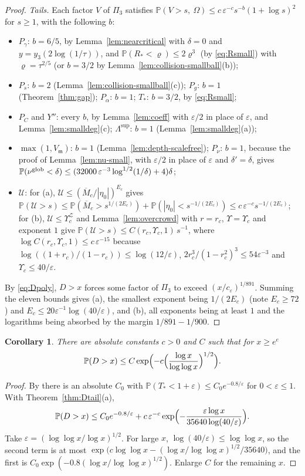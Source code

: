 \documentclass[11pt]{amsart}
\newtheorem{corollary}[theorem]{Corollary}
\theoremstyle{definition}
\theoremstyle{remark}
\numberwithin{equation}{section}
\newcommand{\PP}{\mathbb{P}}
\newcommand{\eps}{\varepsilon}
\begin{document}
\begin{proof}
\emph{Tails.} Each factor $V$ of $\Pi_3$ satisfies $\PP(V>s,\ \Omega)\le c\,\eps^{-c}s^{-b}(1+\log s)^2$ for $s\ge1$, with the following $b$:
\begin{itemize}
\item $P_\gamma$: $b=6/5$, by Lemma~\ref{lem:nearcritical} with $\delta=0$ and $y=y_3(2\log(1/\tau))$, and $\PP(R_*<\varrho)\le2\varrho^3$ (by \eqref{eq:Rsmall}) with $\varrho=\tau^{2/5}$ (or $b=3/2$ by Lemma~\ref{lem:collision-smallball}(b));
\item $P_s$: $b=2$ (Lemma~\ref{lem:collision-smallball}(c)); $P_g$: $b=1$ (Theorem~\ref{thm:gap}); $P_\alpha$: $b=1$; $T_*$: $b=3/2$, by \eqref{eq:Rsmall};
\item $P_C$ and $Y''$: every $b$, by Lemma~\ref{lem:coeff} with $\eps/2$ in place of $\eps$, and Lemma~\ref{lem:smalldeg}(c); $\Lambda^{\sup}$: $b=1$ (Lemma~\ref{lem:smalldeg}(a));
\item $\max(1,V_{\mathfrak m})$: $b=1$ (Lemma~\ref{lem:depth-scalefree}); $P_\nu$: $b=1$, because the proof of Lemma~\ref{lem:nu-small}, with $\eps/2$ in place of $\eps$ and $\delta'=\delta$, gives $\PP(\nu^{\rm glob}<\delta)\le(32000\,\eps^{-3}\log^{1/2}(1/\delta)+4)\delta$;
\item $\mathcal U$: for (a), $\mathcal U\le(\overline M_c/|\eta_0|)^{E_c}$ gives $\PP(\mathcal U>s)\le\PP(\overline M_c>s^{1/(2E_c)})+\PP(|\eta_0|<s^{-1/(2E_c)})\le c\,\eps^{-c}s^{-1/(2E_c)}$; for (b), $\mathcal U\le\Upsilon_c^{\mathcal Z}$ and Lemma~\ref{lem:overcrowd} with $r=r_c$, $\Upsilon=\Upsilon_c$ and exponent $1$ give $\PP(\mathcal U>s)\le C(r_c,\Upsilon_c,1)\,s^{-1}$, where $\log C(r_c,\Upsilon_c,1)\le c\,\eps^{-15}$ because $\log((1+r_c)/(1-r_c))\le\log(12/\eps)$, $2r_c^3/(1-r_c^2)^3\le54\eps^{-3}$ and $\Upsilon_c\le40/\eps$.
\end{itemize}
By \eqref{eq:Dpoly}, $D>x$ forces some factor of $\Pi_3$ to exceed $(x/c_\eps)^{1/891}$. Summing the eleven bounds gives (a), the smallest exponent being $1/(2E_c)$ (note $E_c\ge72$) and $E_c\le20\eps^{-1}\log(40/\eps)$, and (b), all exponents being at least $1$ and the logarithms being absorbed by the margin $1/891-1/900$.
\end{proof}

\begin{corollary}\label{cor:Dtail}
There are absolute constants $c>0$ and $C$ such that for $x\ge e^e$
\[
\PP(D>x)\le C\exp\Bigl(-c\Bigl(\frac{\log x}{\log\log x}\Bigr)^{1/2}\Bigr).
\]
\end{corollary}

\begin{proof}
By \cite[Theorem~\ref{M-thm:sharp}]{Main} there is an absolute $C_0$ with $\PP(T_*<1+\eps)\le C_0e^{-0.8/\eps}$ for $0<\eps\le1$. With Theorem~\ref{thm:Dtail}(a),
\[
\PP(D>x)\le C_0e^{-0.8/\eps}+c\,\eps^{-c}\exp\Bigl(-\frac{\eps\log x}{35640\log(40/\eps)}\Bigr).
\]
Take $\eps=(\log\log x/\log x)^{1/2}$. For large $x$, $\log(40/\eps)\le\log\log x$, so the second term is at most $\exp\bigl(c\log\log x-(\log x/\log\log x)^{1/2}/35640\bigr)$, and the first is $C_0\exp(-0.8(\log x/\log\log x)^{1/2})$. Enlarge $C$ for the remaining $x$.
\end{proof}
\end{document}
